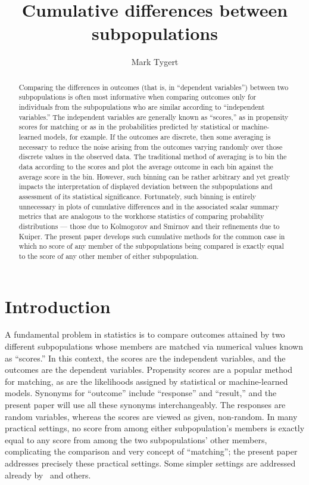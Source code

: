 \documentclass{article}
\title{Cumulative differences between subpopulations}
\author{Mark Tygert}
\begin{document}
\maketitle



\begin{abstract}
Comparing the differences in outcomes (that is, in ``dependent variables'')
between two subpopulations
is often most informative when comparing outcomes only for individuals
from the subpopulations who are similar according to ``independent variables.''
The independent variables are generally known as ``scores,''
as in propensity scores for matching or as in the probabilities predicted
by statistical or machine-learned models, for example.
If the outcomes are discrete, then some averaging is necessary
to reduce the noise arising from the outcomes varying randomly
over those discrete values in the observed data.
The traditional method of averaging is to bin the data according to the scores
and plot the average outcome in each bin against the average score in the bin.
However, such binning can be rather arbitrary and yet greatly impacts
the interpretation of displayed deviation between the subpopulations
and assessment of its statistical significance.
Fortunately, such binning is entirely unnecessary in plots
of cumulative differences and in the associated scalar summary metrics that are
analogous to the workhorse statistics of comparing probability distributions
--- those due to Kolmogorov and Smirnov and their refinements due to Kuiper.
The present paper develops such cumulative methods
for the common case in which no score of any member
of the subpopulations being compared is exactly equal to the score
of any other member of either subpopulation.
\end{abstract}



\section{Introduction}
\label{intro}

A fundamental problem in statistics is to compare outcomes
attained by two different subpopulations whose members are matched
via numerical values known as ``scores.''
In this context, the scores are the independent variables,
and the outcomes are the dependent variables.
Propensity scores are a popular method for matching,
as are the likelihoods assigned by statistical or machine-learned models.
Synonyms for ``outcome'' include ``response'' and ``result,''
and the present paper will use all these synonyms interchangeably.
The responses are random variables, whereas the scores are viewed as given,
non-random.
In many practical settings, no score from among either subpopulation's members
is exactly equal to any score from among the two subpopulations' other members,
complicating the comparison and very concept of ``matching'';
the present paper addresses precisely these practical settings.
Some simpler settings are addressed already by~\cite{tygert} and others.
\end{document}
